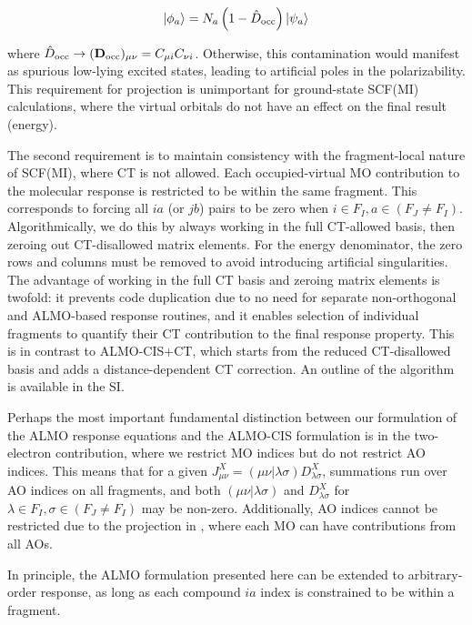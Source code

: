 \begin{equation}
  \label{eq:projected-virtuals}
  \ket{\phi_{a}} = N_{a} \left( 1 - \hat{D}_{\text{occ}} \right) \ket{\psi_{a}}
\end{equation}

where \(\hat{D}_{\text{occ}} \rightarrow (\mathbf{D}_{\text{occ}})_{\mu\nu} = C_{\mu i} C_{\nu i}\). Otherwise, this contamination would manifest as spurious low-lying excited states, leading to artificial poles in the polarizability. This requirement for projection is unimportant for ground-state SCF(MI) calculations, where the virtual orbitals do not have an effect on the final result (energy).

The second requirement is to maintain consistency with the fragment-local nature of SCF(MI), where CT is not allowed. Each occupied-virtual MO contribution to the molecular response is restricted to be within the same fragment. This corresponds to forcing all \(ia\) (or \(jb\)) pairs to be zero when \(i \in F_{I}, a \in (F_{J} \neq F_{I})\). Algorithmically, we do this by always working in the full CT-allowed basis, then zeroing out CT-disallowed matrix elements. For the energy denominator, the zero rows and columns must be removed to avoid introducing artificial singularities. The advantage of working in the full CT basis and zeroing matrix elements is twofold: it prevents code duplication due to no need for separate non-orthogonal and ALMO-based response routines, and it enables selection of individual fragments to quantify their CT contribution to the final response property. This is in contrast to ALMO-CIS+CT\cite{Ge_2017_44111}, which starts from the reduced CT-disallowed basis and adds a distance-dependent CT correction. An outline of the algorithm is available in the SI.

Perhaps the most important fundamental distinction between our formulation of the ALMO response equations and the ALMO-CIS formulation is in the two-electron contribution, where we restrict MO indices but do not restrict AO indices. This means that for a given \(J_{\mu\nu}^{X} = (\mu\nu|\lambda\sigma)D_{\lambda\sigma}^{X}\), summations run over AO indices on all fragments, and both \((\mu\nu|\lambda\sigma)\) and \(D_{\lambda\sigma}^{X}\) for \(\lambda\in F_{I}, \sigma\in (F_{J} \neq F_{I})\) may be non-zero. Additionally, AO indices cannot be restricted due to the projection in , where each MO can have contributions from all AOs.

In principle, the ALMO formulation presented here can be extended to arbitrary-order response, as long as each compound \(ia\) index is constrained to be within a fragment.


